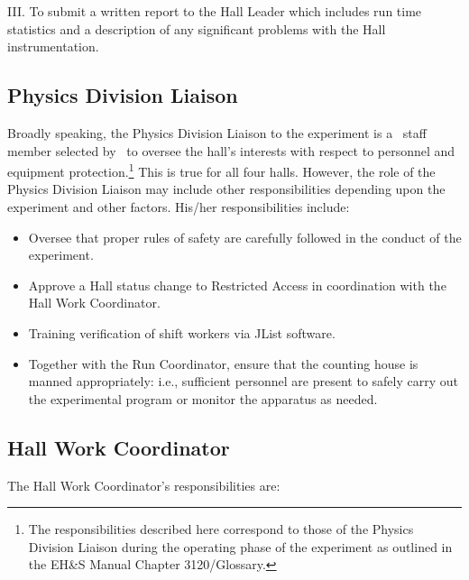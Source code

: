 \documentclass[10pt]{article}
\begin{document}
\noindent III. To submit a written report to the Hall Leader which includes
run time statistics and a description of any significant problems with the
Hall instrumentation.


\subsection{Physics Division Liaison}

Broadly speaking, the Physics Division Liaison to the experiment
is a \HALL\ staff member selected by \HALLLEADER\
to oversee the hall's interests with respect to personnel and equipment
protection.\footnote{The responsibilities described here correspond
to those of the Physics Division Liaison during
the operating phase of the experiment as outlined in the
EH\&S Manual Chapter 3120/Glossary.}
This is true for all four halls. However, the role of
the Physics Division Liaison may include other responsibilities
depending upon the experiment and other factors. His/her responsibilities
include:
\begin{itemize}
\item Oversee that proper rules of safety are carefully followed in the
conduct of the experiment.
\item Approve a Hall status change to Restricted Access in coordination
with the Hall Work Coordinator.
\item Training verification of shift workers via JList software.
\item Together with the Run Coordinator,
ensure that the counting house is manned appropriately: i.e.,
sufficient personnel are present to safely carry out the experimental
program or monitor the apparatus as needed.
\end{itemize}

\subsection{Hall Work Coordinator}

The Hall Work Coordinator's responsibilities are:
\end{document}
